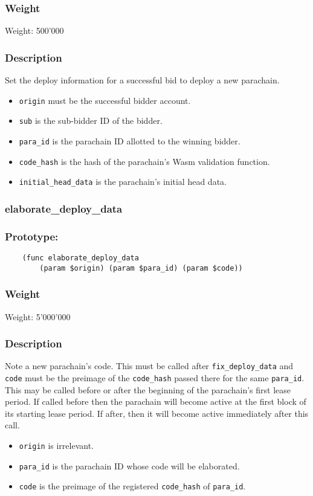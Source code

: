 \documentclass[11pt,a4paper]{article}
\begin{document}
\subsubsection*{Weight}
Weight: 500'000
\subsubsection*{Description}
Set the deploy information for a successful bid to deploy a new parachain.

\begin{itemize}
\item \verb|origin| must be the successful bidder account.
\item \verb|sub| is the sub-bidder ID of the bidder.
\item \verb|para_id| is the parachain ID allotted to the winning bidder.
\item \verb|code_hash| is the hash of the parachain's Wasm validation function.
\item \verb|initial_head_data| is the parachain's initial head data.
\end{itemize}

\subsubsection{elaborate\_deploy\_data}
\subsubsection*{Prototype:}
\begin{verbatim}
    (func elaborate_deploy_data
        (param $origin) (param $para_id) (param $code))
\end{verbatim}
\subsubsection*{Weight}
Weight: 5'000'000
\subsubsection*{Description}
Note a new parachain's code. This must be called after \verb|fix_deploy_data| and \verb|code| must be the preimage of the \verb|code_hash| passed there for the same \verb|para_id|. This may be called before or after the beginning of the parachain's first lease period. If called before then the parachain will become active at the first block of its starting lease period. If after, then it will become active immediately after this call.

\begin{itemize}
\item \verb|origin| is irrelevant.
\item \verb|para_id| is the parachain ID whose code will be elaborated.
\item \verb|code| is the preimage of the registered \verb|code_hash| of \verb|para_id|.
\end{itemize}
\end{document}
